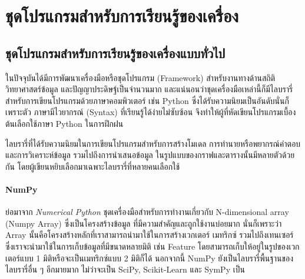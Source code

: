 

\section{ชุดโปรแกรมสำหรับการเรียนรู้ของเครื่อง}
\label{ap:library_ml}

\subsection{ชุดโปรแกรมสำหรับการเรียนรู้ของเครื่องแบบทั่วไป}

ในปัจจุบันได้มีการพัฒนาเครื่องมือหรือชุดโปรแกรม (Framework) สำหรับงานทางด้านสถิติ วิทยาศาสตร์ข้อมูล และปัญญาประดิษฐ์เป็นจำนวนมาก
และแน่นอนว่าชุดเครื่องมือเหล่านี้ก็มีไลบรารี่สำหรับการเขียนโปรแกรมด้วยภาษาคอมพิวเตอร์ เช่น Python ซึ่งได้รับความนิยมเป็นอันดับนั่นก็เพราะตัว%
ภาษามีไวยากรณ์ (Syntax) ที่เรียนรู้ได้ง่ายไม่ซับซ้อน จึงทำให้ผู้ที่หัดเขียนโปรแกรมเบื้องต้นเลือกใช้ภาษา Python ในการฝึกฝน 

ไลบรารี่ที่ได้รับความนิยมในการเขียนโปรแกรมสำหรับการสร้างโมเดล การทำนายหรือพยากรณ์คำตอบ และการวิเคราะห์ข้อมูล รวมไปถึงการนำเสนอข้อมูล%
ในรูปแบบของกราฟและตารางนั้นมีหลายตัวด้วยกัน โดยผู้เขียนหยิบเลือกมาเฉพาะไลบรารี่ที่หลายคนเลือกใช้

\paragraph{\textbf{NumPy}}
ย่อมาจาก \textit{Numerical Python} ชุดเครื่องมือสำหรับการทำงานเกี่ยวกับ N-dimensional array (Numpy Array) ซึ่งเป็นโครงสร้างข้อมูล%
ที่มีความสำคัญและถูกใช้งานบ่อยมาก นั่นก็เพราะว่า Array นั้นคือโครงสร้างหลักที่เราสามารถนำมาใช้ในการสร้างเวกเตอร์ เมทริกซ์ รวมไปถึงเทนเซอร์
ซึ่งเราจะนำมาใช้ในการเก็บข้อมูลที่มีขนาดหลายมิติ เช่น Feature โดยสามารถเก็บให้อยู่ในรูปของเวกเตอร์แบบ 1 มิติหรือจะเป็นเมทริกซ์แบบ 2 มิติก็ได้
นอกจากนี้ NumPy ยังเป็นไลบรารี่พื้นฐานของไลบรารี่อื่น ๆ อีกมายมาก ไม่ว่าจะเป็น SciPy, Scikit-Learn และ SymPy เป็น

